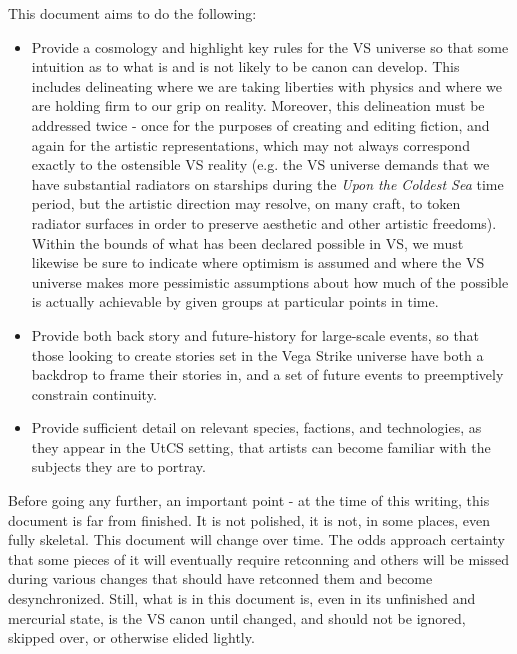 This document aims to do the following:
\begin{itemize}
\item Provide a cosmology and highlight key rules for the VS universe
   so that some intuition as to what is and is not likely to be canon
   can develop. This includes delineating where we are taking
   liberties with physics and where we are holding firm to our grip on
   reality. Moreover, this delineation must be addressed twice - once
   for the purposes of creating and editing fiction, and again for the
   artistic representations, which may not always correspond exactly
   to the ostensible VS reality (e.g. the VS universe demands that we
   have substantial radiators on starships during the {\it Upon the
   Coldest Sea} time period, but the artistic direction may resolve,
   on many craft, to token radiator surfaces in order to preserve
   aesthetic and other artistic freedoms). Within the bounds of what
   has been declared possible in VS, we must likewise be sure to
   indicate where optimism is assumed and where the VS universe makes
   more pessimistic assumptions about how much of the possible is
   actually achievable by given groups at particular points in time.
\item Provide both back story and future-history for large-scale
  events, so that those looking to create stories set in the Vega
  Strike universe have both a backdrop to frame their stories in, and
  a set of future events to preemptively constrain continuity.
\item Provide sufficient detail on relevant species, factions, and
  technologies, as they appear in the UtCS setting, that artists can
  become familiar with the subjects they are to portray.
\end{itemize}

Before going any further, an important point - at the time of this
writing, this document is far from finished. It is not polished, it is
not, in some places, even fully skeletal. This document will change
over time. The odds approach certainty that some pieces of it will
eventually require retconning and others will be missed during various
changes that should have retconned them and become
desynchronized. Still, what is in this document is, even in its
unfinished and mercurial state, is the VS canon until changed, and
should not be ignored, skipped over, or otherwise elided lightly.


